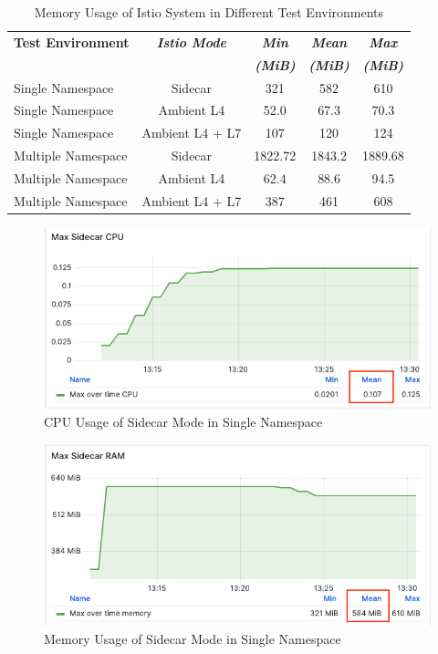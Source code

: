 \begin{table}[ht!]
  \centering
  \begin{tabular}{ |l|c|c|c|c|}
    \hline
    \textbf{Test Environment} & \textbf{\textit{Istio Mode}} & \textbf{\textit{Min}} & \textbf{\textit{Mean}} & \textbf{\textit{Max}} \\
    \textbf{\textit{ }} & \textbf{\textit{ }} & \textbf{\textit{(MiB)}} & \textbf{\textit{(MiB)}} & \textbf{\textit{(MiB)}} \\ \hline
    Single Namespace & Sidecar & 321 & 582 & 610 \\ \hline
    Single Namespace & Ambient L4 & 52.0 & 67.3 & 70.3 \\ \hline
    Single Namespace & Ambient L4 + L7 & 107 & 120 & 124 \\ \hline
    
    Multiple Namespace & Sidecar & 1822.72 & 1843.2 & 1889.68 \\ \hline
    Multiple Namespace & Ambient L4 & 62.4 & 88.6 & 94.5 \\ \hline
    Multiple Namespace & Ambient L4 + L7 & 387 & 461 & 608 \\ \hline
  \end{tabular}
  \caption{Memory Usage of Istio System in Different Test Environments}
  \label{allMemResultsTable}
\end{table}


\begin{figure}[H]
  \centering
  \includegraphics[width=0.8\linewidth]{resources/max-sidecar-cpu.png}
  \caption{CPU Usage of Sidecar Mode in Single Namespace}
\end{figure}

\begin{figure}[H]
  \centering
  \includegraphics[width=0.8\linewidth]{resources/max-sidecar-mem.png}
  \caption{Memory Usage of Sidecar Mode in Single Namespace}
\end{figure}

